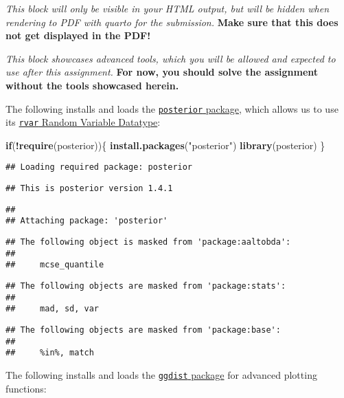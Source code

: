 \documentclass[
]{article}
\newenvironment{Shaded}{\begin{snugshade}}{\end{snugshade}}
\newcommand{\ControlFlowTok}[1]{\textcolor[rgb]{0.13,0.29,0.53}{\textbf{#1}}}
\newcommand{\FunctionTok}[1]{\textcolor[rgb]{0.13,0.29,0.53}{\textbf{#1}}}
\newcommand{\NormalTok}[1]{#1}
\newcommand{\SpecialCharTok}[1]{\textcolor[rgb]{0.81,0.36,0.00}{\textbf{#1}}}
\newcommand{\StringTok}[1]{\textcolor[rgb]{0.31,0.60,0.02}{#1}}
\begin{document}
\emph{This block will only be visible in your HTML output, but will be
hidden when rendering to PDF with quarto for the submission.}
\textbf{Make sure that this does not get displayed in the PDF!}

\emph{This block showcases advanced tools, which you will be allowed and
expected to use after this assignment.} \textbf{For now, you should
solve the assignment without the tools showcased herein.}

The following installs and loads the
\href{https://mc-stan.org/posterior/index.html}{\texttt{posterior}
package}, which allows us to use its
\href{https://mc-stan.org/posterior/articles/rvar.html}{\texttt{rvar}
Random Variable Datatype}:

\begin{Shaded}
\begin{Highlighting}[]
\ControlFlowTok{if}\NormalTok{(}\SpecialCharTok{!}\FunctionTok{require}\NormalTok{(posterior))\{}
    \FunctionTok{install.packages}\NormalTok{(}\StringTok{"posterior"}\NormalTok{)}
    \FunctionTok{library}\NormalTok{(posterior)}
\NormalTok{\}}
\end{Highlighting}
\end{Shaded}

\begin{verbatim}
## Loading required package: posterior
\end{verbatim}

\begin{verbatim}
## This is posterior version 1.4.1
\end{verbatim}

\begin{verbatim}
## 
## Attaching package: 'posterior'
\end{verbatim}

\begin{verbatim}
## The following object is masked from 'package:aaltobda':
## 
##     mcse_quantile
\end{verbatim}

\begin{verbatim}
## The following objects are masked from 'package:stats':
## 
##     mad, sd, var
\end{verbatim}

\begin{verbatim}
## The following objects are masked from 'package:base':
## 
##     %in%, match
\end{verbatim}

The following installs and loads the
\href{https://mjskay.github.io/ggdist/}{\texttt{ggdist} package} for
advanced plotting functions:
\end{document}
